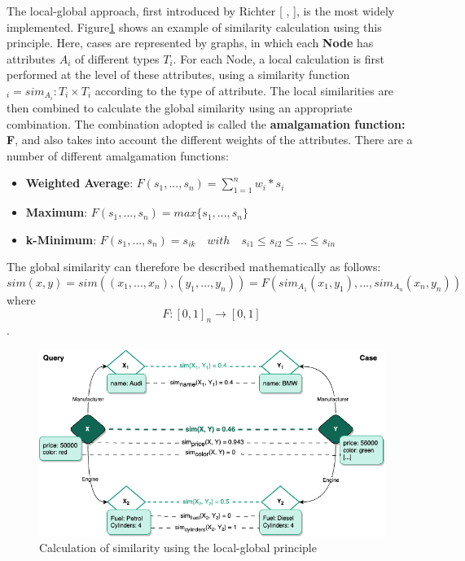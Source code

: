     The local-global approach, first introduced by Richter [ , ], is the most widely implemented. Figure\ref{fig:cbr-exam} shows an example of similarity calculation using this principle. Here, cases are represented by graphs, in which each \textbf{Node} has attributes $A_i$ of different types $T_i$. For each Node, a local calculation is first performed at the level of these attributes, using a similarity function $_i = sim_{A_i} : T_i \times T_i$ according to the type of attribute. The local similarities are then combined to calculate the global similarity using an appropriate combination. The combination adopted is called the \textbf{amalgamation function: F}, and also takes into account the different weights of the attributes. There are a number of different amalgamation functions:
    \begin{itemize}
        \item \textbf{Weighted Average}: $F(s_1,...,s_n)= \sum_{1=1}^{n} w_i*s_i$
        \item \textbf{Maximum}: $F(s_1,...,s_n) = max\{s_1,...,s_n\}$
        \item \textbf{k-Minimum}: $F(s_1,...,s_n) = s_{ik} \quad with \quad s_{i1} \leq s_{i2} \leq ... \leq s_{in}$
    \end{itemize}
    
    The global similarity can therefore be described mathematically as follows:\\
    \[sim(x,y) = sim((x_1,...,x_n),(y_1,...,y_n)) = F(sim_{A_1}(x_1, y_1),..., sim_{A_n}(x_n, y_n) )\] where \[F: [0,1]_n \rightarrow [0,1]\].\\


    \begin{figure}[h]
    \centering
    \includegraphics[scale=0.6]{images/Concept-CBR Exemple.drawio.png}
    \caption{\label{fig:cbr-exam}  Calculation of similarity using the local-global principle}
    \end{figure}
    
